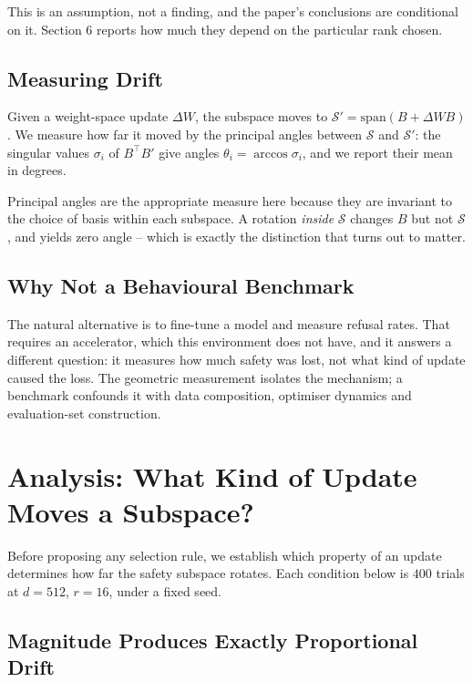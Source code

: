 \documentclass[10pt,journal,compsoc,twocolumn]{IEEEtran}
\begin{document}
This is an assumption, not a finding, and the paper's conclusions are conditional on it. Section 6 reports how much they depend on the particular rank chosen.


\subsection{Measuring Drift}


Given a weight-space update $\Delta W$, the subspace moves to $\mathcal{S}' = \mathrm{span}(B + \Delta W B)$. We measure how far it moved by the principal angles between $\mathcal{S}$ and $\mathcal{S}'$: the singular values $\sigma_i$ of $B^{\top} B'$ give angles $\theta_i = \arccos \sigma_i$, and we report their mean in degrees.

Principal angles are the appropriate measure here because they are invariant to the choice of basis within each subspace. A rotation \textit{inside} $\mathcal{S}$ changes $B$ but not $\mathcal{S}$, and yields zero angle -- which is exactly the distinction that turns out to matter.


\subsection{Why Not a Behavioural Benchmark}


The natural alternative is to fine-tune a model and measure refusal rates. That requires an accelerator, which this environment does not have, and it answers a different question: it measures how much safety was lost, not what kind of update caused the loss. The geometric measurement isolates the mechanism; a benchmark confounds it with data composition, optimiser dynamics and evaluation-set construction.




\section{Analysis: What Kind of Update Moves a Subspace?}


Before proposing any selection rule, we establish which property of an update determines how far the safety subspace rotates. Each condition below is $400$ trials at $d = 512$, $r = 16$, under a fixed seed.


\subsection{Magnitude Produces Exactly Proportional Drift}
\end{document}
